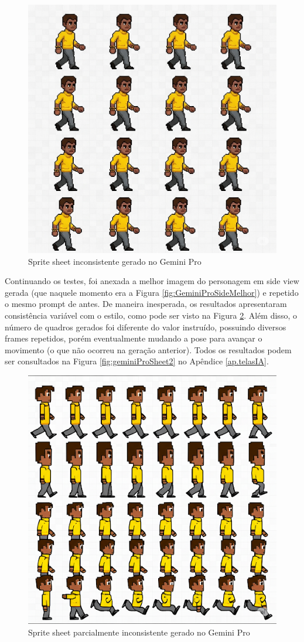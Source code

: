 \begin{figure}[htbp]
    \centering
    \caption{\small Sprite sheet inconsistente gerado no Gemini Pro}
    \label{fig:GeminiProSpriteSheetInconsistente}
    \includegraphics[width=0.5\linewidth]{figs/geminiPro/chat8/tela1_res5.PNG}
\end{figure}

Continuando os testes, foi anexada a melhor imagem do personagem em side view gerada (que naquele momento era a Figura \ref{fig:GeminiProSideMelhor}) e repetido o mesmo prompt de antes. De maneira inesperada, os resultados apresentaram consistência variável com o estilo, como pode ser visto na Figura \ref{fig:GeminiProSpriteSheetConsistenciaVariavel}. Além disso, o número de quadros gerados foi diferente do valor instruído, possuindo diversos frames repetidos, porém eventualmente mudando a pose para avançar o movimento (o que não ocorreu na geração anterior). Todos os resultados podem ser consultados na Figura \ref{fig:geminiProSheet2} no Apêndice \ref{ap.telasIA}.

\begin{figure}[htbp]
    \centering
    \caption{\small Sprite sheet parcialmente inconsistente gerado no Gemini Pro}
    \label{fig:GeminiProSpriteSheetConsistenciaVariavel}
    \includegraphics[width=0.5\linewidth]{figs/geminiPro/chat8/tela2_res1.PNG}
\end{figure}

